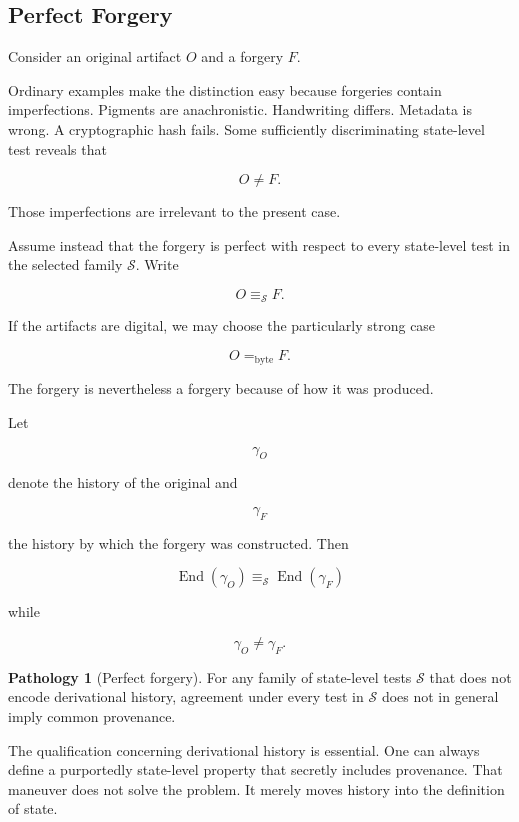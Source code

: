 \documentclass[
  11pt,
  a4paper,
  DIV=12,
  BCOR=0mm,
  parskip=half-
]{scrartcl}
\newcommand{\eqbyte}{=_{\mathrm{byte}}}
\newcommand{\End}{\operatorname{End}}
\theoremstyle{definition}
\newtheorem{pathology}[definition]{Pathology}
\theoremstyle{plain}
\theoremstyle{remark}
\begin{document}

\subsection{Perfect Forgery}
\label{sec:perfect-forgery}

Consider an original artifact \(O\) and a forgery \(F\).

Ordinary examples make the distinction easy because forgeries contain
imperfections. Pigments are anachronistic. Handwriting differs. Metadata is
wrong. A cryptographic hash fails. Some sufficiently discriminating
state-level test reveals that

\[
  O\neq F.
\]

Those imperfections are irrelevant to the present case.

Assume instead that the forgery is perfect with respect to every state-level
test in the selected family \(\mathcal S\). Write

\[
  O\equiv_{\mathcal S}F.
\]

If the artifacts are digital, we may choose the particularly strong case

\[
  O\eqbyte F.
\]

The forgery is nevertheless a forgery because of how it was produced.

Let

\[
  \gamma_O
\]

denote the history of the original and

\[
  \gamma_F
\]

the history by which the forgery was constructed. Then

\[
  \End(\gamma_O)\equiv_{\mathcal S}\End(\gamma_F)
\]

while

\[
  \gamma_O\neq\gamma_F.
\]

\begin{pathology}[Perfect forgery]
\label{path:perfect-forgery}
For any family of state-level tests \(\mathcal S\) that does not encode
derivational history, agreement under every test in \(\mathcal S\) does not
in general imply common provenance.
\end{pathology}

The qualification concerning derivational history is essential. One can
always define a purportedly state-level property that secretly includes
provenance. That maneuver does not solve the problem. It merely moves history
into the definition of state.
\end{document}
